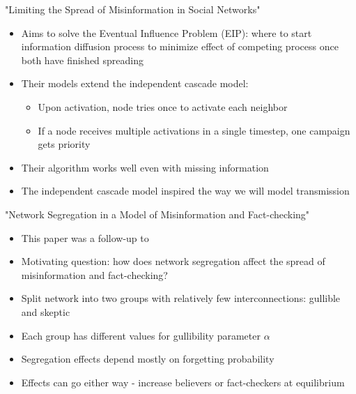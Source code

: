 \documentclass{beamer}
\begin{document}
\begin{frame}{"Limiting the Spread of Misinformation in Social Networks"}
    \begin{itemize}
        \item Aims to solve the Eventual Influence Problem (EIP): where to start information diffusion process to minimize effect of competing process once both have finished spreading
        \item Their models extend the independent cascade model:
        \begin{itemize}
            \item Upon activation, node tries once to activate each neighbor
            \item If a node receives multiple activations in a single timestep, one campaign gets priority
        \end{itemize}
        \item Their algorithm works well even with missing information
        \item The independent cascade model inspired the way we will model transmission
    \end{itemize}
\end{frame}

\begin{frame}{"Network Segregation in a Model of Misinformation and Fact-checking"}
\begin{itemize}
    \item This paper was a follow-up to 
    \item Motivating question: how does network segregation affect the spread of misinformation and fact-checking?
    \item Split network into two groups with relatively few interconnections: gullible and skeptic
    \item Each group has different values for gullibility parameter $\alpha$
    \item Segregation effects depend mostly on forgetting probability 
    \item Effects can go either way - increase believers or fact-checkers at equilibrium
\end{itemize}
\end{frame}
\end{document}
